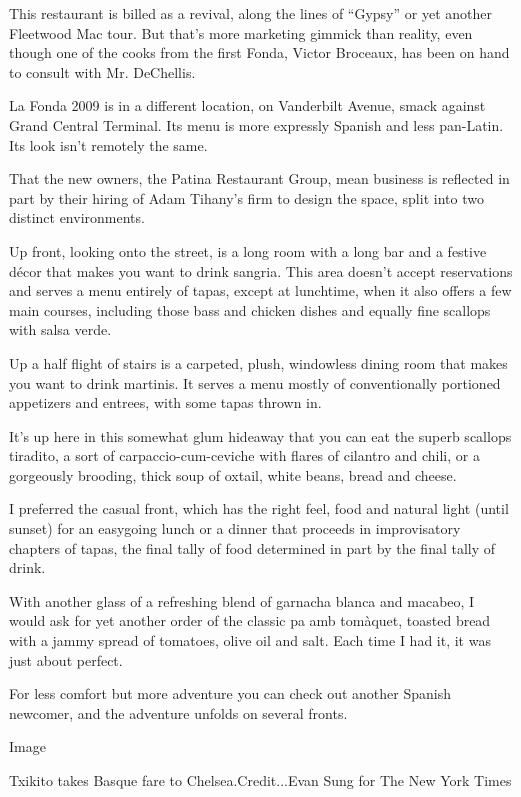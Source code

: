 This restaurant is billed as a revival, along the lines of ``Gypsy'' or
yet another Fleetwood Mac tour. But that's more marketing gimmick than
reality, even though one of the cooks from the first Fonda, Victor
Broceaux, has been on hand to consult with Mr. DeChellis.

La Fonda 2009 is in a different location, on Vanderbilt Avenue, smack
against Grand Central Terminal. Its menu is more expressly Spanish and
less pan-Latin. Its look isn't remotely the same.

That the new owners, the Patina Restaurant Group, mean business is
reflected in part by their hiring of Adam Tihany's firm to design the
space, split into two distinct environments.

Up front, looking onto the street, is a long room with a long bar and a
festive décor that makes you want to drink sangria. This area doesn't
accept reservations and serves a menu entirely of tapas, except at
lunchtime, when it also offers a few main courses, including those bass
and chicken dishes and equally fine scallops with salsa verde.

Up a half flight of stairs is a carpeted, plush, windowless dining room
that makes you want to drink martinis. It serves a menu mostly of
conventionally portioned appetizers and entrees, with some tapas thrown
in.

It's up here in this somewhat glum hideaway that you can eat the superb
scallops tiradito, a sort of carpaccio-cum-ceviche with flares of
cilantro and chili, or a gorgeously brooding, thick soup of oxtail,
white beans, bread and cheese.

I preferred the casual front, which has the right feel, food and natural
light (until sunset) for an easygoing lunch or a dinner that proceeds in
improvisatory chapters of tapas, the final tally of food determined in
part by the final tally of drink.

With another glass of a refreshing blend of garnacha blanca and macabeo,
I would ask for yet another order of the classic pa amb tomàquet,
toasted bread with a jammy spread of tomatoes, olive oil and salt. Each
time I had it, it was just about perfect.

For less comfort but more adventure you can check out another Spanish
newcomer, and the adventure unfolds on several fronts.

Image

Txikito takes Basque fare to Chelsea.Credit...Evan Sung for The New York
Times

